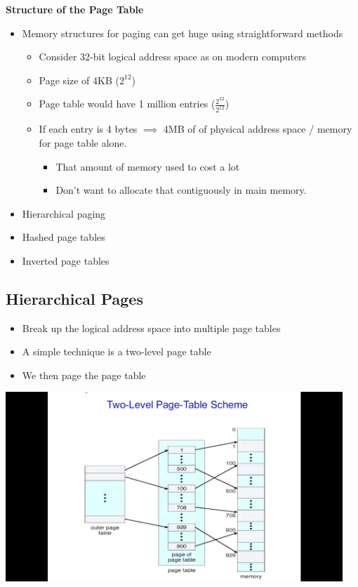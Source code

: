 \documentclass[11pt,a4paper]{article}
\begin{document}
\textbf{Structure of the Page Table}
\begin{itemize}
    \item Memory structures for paging can get huge using straightforward methods
        \begin{itemize}
            \item Consider 32-bit logical address space as on modern computers
            \item Page size of 4KB ($2^{12}$)
            \item Page table would have 1 million entries ($\frac{2^{32}}{2^{12}}$)
            \item If each entry is 4 bytes $\implies$ 4MB of of physical address space /
                memory for page table alone.
                \begin{itemize}
                    \item That amount of memory used to cost a lot
                    \item Don't want to allocate that contiguously in main memory.
                \end{itemize}
        \end{itemize}
    \item Hierarchical paging
    \item Hashed page tables
    \item Inverted page tables
\end{itemize}

\subsection{Hierarchical Pages}
\begin{itemize}
    \item Break up the logical address space into multiple page tables
    \item A simple technique is a two-level page table
    \item We then page the page table
\end{itemize}

\includegraphics[height=270]{two-level-page-table-scheme.jpg}
\end{document}

